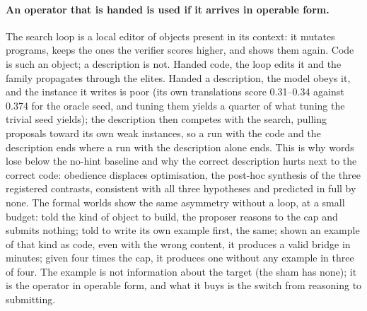 \documentclass[11pt]{article}
\begin{document}
\paragraph{An operator that is handed is used if it arrives in operable
form.} The search loop is a local editor of objects present in its
context: it mutates programs, keeps the ones the verifier scores higher,
and shows them again. Code is such an object; a description is not. Handed
code, the loop edits it and the family propagates through the elites.
Handed a description, the model obeys it, and the instance it writes is
poor (its own translations score 0.31--0.34 against 0.374 for the oracle
seed, and tuning them yields a quarter of what tuning the trivial seed
yields); the description then competes with the search, pulling proposals
toward its own weak instances, so a run with the code and the description
ends where a run with the description alone ends. This is why words lose
below the no-hint baseline and why the correct description hurts next to
the correct code: obedience displaces optimisation, the post-hoc
synthesis of the three registered contrasts, consistent with all three
hypotheses and predicted in full by none. The formal worlds show the same
asymmetry without a loop, at a small budget: told the kind of object to
build, the proposer reasons to the cap and submits nothing; told to write
its own example first, the same; shown an example of that kind as code,
even with the wrong content, it produces a valid bridge in minutes; given
four times the cap, it produces one without any example in three of four.
The example is not information about the target (the sham has none); it is
the operator in operable form, and what it buys is the switch from
reasoning to submitting.
\end{document}
